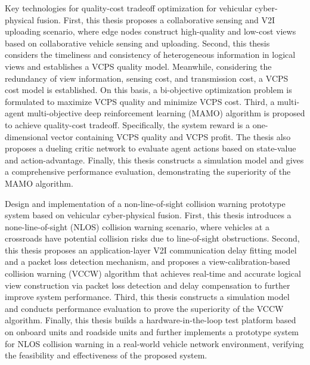 \begin{eabstract}
 Key technologies for quality-cost tradeoff optimization for vehicular cyber-physical fusion. First, this thesis proposes a collaborative sensing and V2I uploading scenario, where edge nodes construct high-quality and low-cost views based on collaborative vehicle sensing and uploading. Second, this thesis considers the timeliness and consistency of heterogeneous information in logical views and establishes a VCPS quality model. Meanwhile, considering the redundancy of view information, sensing cost, and transmission cost, a VCPS cost model is established. On this basis, a bi-objective optimization problem is formulated to maximize VCPS quality and minimize VCPS cost. Third, a multi-agent multi-objective deep reinforcement learning (MAMO) algorithm is proposed to achieve quality-cost tradeoff. Specifically, the system reward is a one-dimensional vector containing VCPS quality and VCPS profit. The thesis also proposes a dueling critic network to evaluate agent actions based on state-value and action-advantage. Finally, this thesis constructs a simulation model and gives a comprehensive performance evaluation, demonstrating the superiority of the MAMO algorithm.

 Design and implementation of a non-line-of-sight collision warning prototype system based on vehicular cyber-physical fusion. First, this thesis introduces a none-line-of-sight (NLOS) collision warning scenario, where vehicles at a crossroads have potential collision risks due to line-of-sight obstructions. Second, this thesis proposes an application-layer V2I communication delay fitting model and a packet loss detection mechanism, and proposes a view-calibration-based collision warning (VCCW) algorithm that achieves real-time and accurate logical view construction via packet loss detection and delay compensation to further improve system performance. Third, this thesis constructs a simulation model and conducts performance evaluation to prove the superiority of the VCCW algorithm. Finally, this thesis builds a hardware-in-the-loop test platform based on onboard units and roadside units and further implements a prototype system for NLOS collision warning in a real-world vehicle network environment, verifying the feasibility and effectiveness of the proposed system.
 
\end{eabstract}

